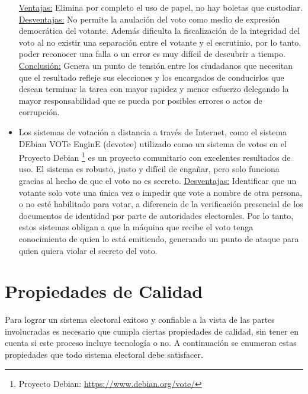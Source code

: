 \begin{itemize}
    \underline{Ventajas:} Elimina por completo el uso de papel, no hay boletas que custodiar.\newline
    \underline{Desventajas:} No permite la anulación del voto como medio de expresión democrática del votante. Además dificulta la fiscalización de la integridad del voto al no existir una separación entre el votante y el escrutinio, por lo tanto, poder reconocer una falla o un error es muy difícil de descubrir a tiempo. \newline
    \underline{Conclusión:} Genera un punto de tensión entre los ciudadanos que necesitan que el resultado refleje sus elecciones y los encargados de conducirlos que desean terminar la tarea con mayor rapidez y menor esfuerzo delegando la mayor responsabilidad que se pueda por posibles errores o actos de corrupción.
    \item Los sistemas de votación a distancia a través de Internet, como el sistema DEbian VOTe EnginE (devotee) utilizado como un sistema de votos en el Proyecto Debian \footnote{Proyecto Debian: \url{https://www.debian.org/vote/}} es un proyecto comunitario con excelentes resultados de uso. El sistema es robusto, justo y difícil de engañar, pero solo funciona gracias al hecho de que el voto no es secreto.\newline
    \underline{Desventajas:} Identificar que un votante solo vote una única vez o impedir que vote a nombre de otra persona, o no esté habilitado para votar, a diferencia de la verificación presencial de los documentos de identidad por parte de autoridades electorales. Por lo tanto, estos sistemas obligan a que la máquina que recibe el voto tenga conocimiento de quien lo está emitiendo, generando un punto de ataque para quien quiera violar el secreto del voto.
\end{itemize}


\section{Propiedades de Calidad}
Para lograr un sistema electoral exitoso y confiable a la vista de las partes involucradas es necesario que cumpla ciertas propiedades de calidad, sin tener en cuenta si este proceso incluye tecnología o no. A continuación se enumeran estas propiedades que todo sistema electoral debe satisfacer.


